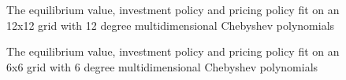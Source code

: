 \documentclass[12pt]{article}
\begin{document}
\begin{figure}[H]
  \centering
  \caption{The equilibrium value, investment policy and pricing policy fit on an 12x12 grid with 12 degree multidimensional Chebyshev polynomials}
  \label{gibbslittle}
\end{figure}

\begin{figure}[H]
  \centering
  \caption{The equilibrium value, investment policy and pricing policy fit on an 6x6 grid with 6 degree multidimensional Chebyshev polynomials}
  \label{gibbsmore}
\end{figure}
\end{document}
